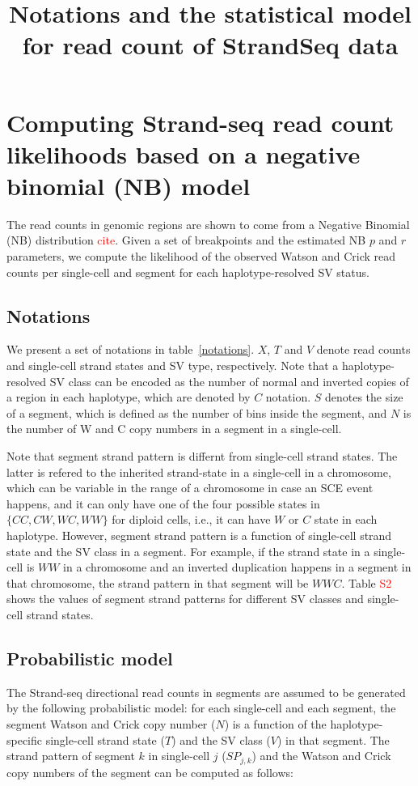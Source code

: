 \documentclass[12pt]{article}
\title{Notations and the statistical model for read count of StrandSeq data}
\renewcommand{\j}{j} %
\newcommand{\X}{X} %
\renewcommand{\k}{k} %
\newcommand{\T}{T} %
\newcommand{\V}{V} %
\begin{document}
\maketitle

\section{Computing Strand-seq read count likelihoods based on a negative binomial (NB) model}

The read counts in genomic regions are shown to come from a Negative Binomial (NB) distribution \textcolor{red}{cite}. %
Given a set of breakpoints and the estimated NB $p$ and $r$ parameters, we compute the likelihood of the observed Watson and Crick read counts per single-cell and segment for each haplotype-resolved SV status.

\subsection{Notations}
We present a set of notations in table~\ref{notations}. $\X$, $\T$ and $\V$ denote read counts and single-cell strand states and SV type, respectively.
Note that a haplotype-resolved SV class can be encoded as the number of normal and inverted copies of a region in each haplotype, which are denoted by $C$ notation.
$S$ denotes the size of a segment, which is defined as the number of bins inside the segment, and $N$ is the number of W and C copy numbers in a segment in a single-cell.

Note that segment strand pattern is differnt from single-cell strand states.
The latter is refered to the inherited strand-state in a single-cell in a chromosome, which can be variable in the range of a chromosome in case an SCE event happens, and it can only have one of the four possible states in $\{CC,CW,WC,WW\}$ for diploid cells, i.e., it can have $W$ or $C$ state in each haplotype.
However, segment strand pattern is a function of single-cell strand state and the SV class in a segment.
For example, if the strand state in a single-cell is $WW$ in a chromosome and an inverted duplication happens in a segment in that chromosome, the strand pattern in that segment will be $WWC$.
Table \textcolor{red}{S2} shows the values of segment strand patterns for different SV classes and single-cell strand states.

\subsection{Probabilistic model}
The Strand-seq directional read counts in segments are assumed to be generated by the following probabilistic model:
for each single-cell and each segment, the segment Watson and Crick copy number ($N$) is a function of the haplotype-specific single-cell strand state ($T$) and the SV class ($V$) in that segment. The strand pattern of segment $\k$ in single-cell $\j$ ($SP_{\j,\k}$) and the Watson and Crick copy numbers of the segment can be computed as follows:
\end{document}
